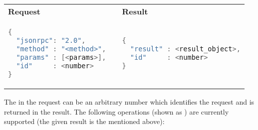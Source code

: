 \begin{tabular}{p{}cp{}}
\bf Request & & \bf Result \\
\begin{lstlisting}[language=java]
{
  "jsonrpc": "2.0",
  "method" : "<method>",
  "params" : [<params>],
  "id"     : <number>
}
\end{lstlisting}
& &
\begin{lstlisting}[language=java]
{
  "result" : <result_object>,
  "id"     : <number>
}
\end{lstlisting}
\end{tabular}

The  in the request can be an arbitrary number which identifies the
request and is returned in the result.
The following operations (shown as ) are currently
supported (the given result is the  mentioned above):
